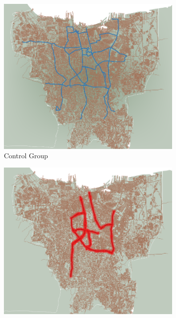 \documentclass[AEJ]{AEA}
\begin{document}
\begin{figure}
    \centering

    \begin{subfigure}{0.3\textwidth}
        \includegraphics[width=1\linewidth]{Graphs/control.png}
        \caption{Control Group}
        \label{fig:sub1}
    \end{subfigure}
    \hfill
    \begin{subfigure}{0.3\textwidth}
        \includegraphics[width=1\linewidth]{Graphs/gage.png}

\end{subfigure}
\end{figure}
\end{document}
